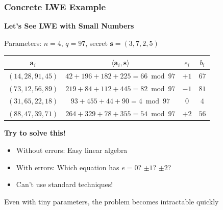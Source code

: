 \documentclass[aspectratio=169,10pt]{beamer}
\newcommand{\teaching}[1]{}
\newcommand{\slideheader}[1]{\frametitle{#1}}
\theoremstyle{plain}
\begin{document}
\begin{frame}
  \slideheader{Concrete LWE Example}
  
  \begin{center}
    \textbf{\large Let's See LWE with Small Numbers}
  \end{center}
  
  Parameters: $n = 4$, $q = 97$, secret $\mathbf{s} = (3, 7, 2, 5)$
  
  \vspace{0.3cm}
  
  \begin{table}
    \centering
    \small
    \begin{tabular}{|c|c|c|c|}
      \hline
      $\mathbf{a}_i$ & $\langle \mathbf{a}_i, \mathbf{s} \rangle$ & $e_i$ & $b_i$ \\
      \hline
      $(14, 28, 91, 45)$ & $42 + 196 + 182 + 225 = 66 \bmod 97$ & $+1$ & $67$ \\
      $(73, 12, 56, 89)$ & $219 + 84 + 112 + 445 = 82 \bmod 97$ & $-1$ & $81$ \\
      $(31, 65, 22, 18)$ & $93 + 455 + 44 + 90 = 4 \bmod 97$ & $0$ & $4$ \\
      $(88, 47, 39, 71)$ & $264 + 329 + 78 + 355 = 54 \bmod 97$ & $+2$ & $56$ \\
      \hline
    \end{tabular}
  \end{table}
  
  \vspace{0.3cm}
  
  \begin{redBox}
    \textbf{Try to solve this!}
    \begin{itemize}
      \item Without errors: Easy linear algebra
      \item With errors: Which equation has $e = 0$? $\pm 1$? $\pm 2$?
      \item Can't use standard techniques!
    \end{itemize}
  \end{redBox}
  
  \vspace{0.3cm}
  
  \begin{greenBox}
    Even with tiny parameters, the problem becomes intractable quickly
  \end{greenBox}
  
  \teaching{Make it tangible with real numbers}
\end{frame}
\end{document}
